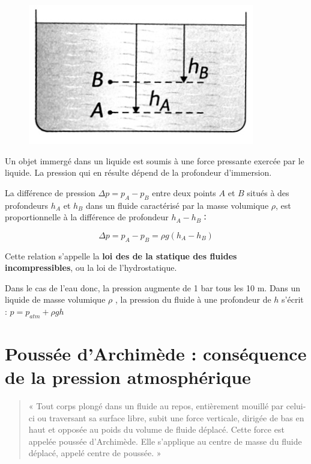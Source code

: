 \documentclass[11pt,a4paper]{article}
\begin{document}
\begin{figure}
\centering
\includegraphics[width=0.9\linewidth]{imgs/p9/p10-1.jpg}
\caption{}
\end{figure}

Un objet immergé dans un liquide est soumis à une force pressante exercée par le liquide. La pression qui en résulte dépend de la profondeur d’immersion.

La différence de pression $\Delta p = p_A - p_B$  entre deux points $A$ et $B$ situés à des profondeurs $h_A$  et $h_B$ dans un fluide caractérisé par la masse volumique $\rho$, est proportionnelle à la différence de profondeur $h_A - h_B$ ∶ 

\[ \Delta p = p_A - p_B = \rho g \left( h_A - h_B \right) \]

Cette relation s'appelle la \textbf{loi des de la statique des fluides incompressibles}, ou la loi de l'hydrostatique.

Dans le cas de l’eau donc, la pression augmente de 1 bar tous les 10 m. Dans un liquide de masse volumique $\rho$ , la pression du fluide à une profondeur de $h$ s’écrit : $p = p_{atm} + \rho g h $

\section{Poussée d'Archimède : conséquence de la pression atmosphérique}
\begin{quote}
    « Tout corps plongé dans un fluide au repos, entièrement mouillé par celui-ci ou traversant sa surface libre, subit une force verticale, dirigée de bas en haut et opposée au poids du volume de fluide déplacé. Cette force est appelée poussée d'Archimède. Elle s'applique au centre de masse du fluide déplacé, appelé centre de poussée. »
\end{quote}
\end{document}

